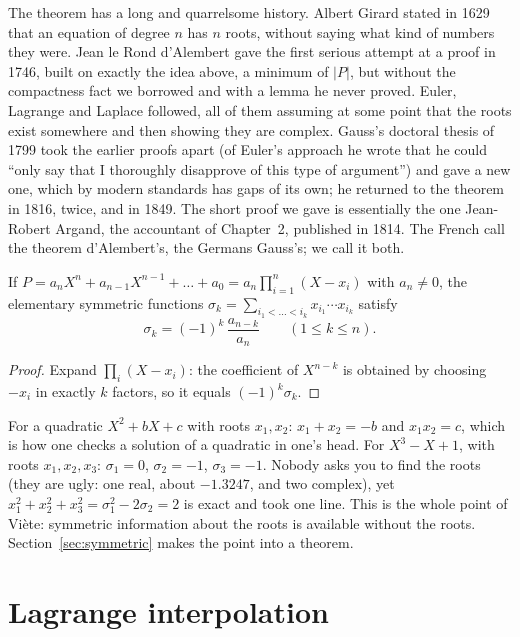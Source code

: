 The theorem has a long and quarrelsome history. Albert Girard stated in 1629 that an equation of degree $n$ has $n$ roots, without saying
what kind of numbers they were. Jean le Rond d'Alembert gave the first serious attempt at a proof in 1746, built on exactly the idea above, a
minimum of $|P|$, but without the compactness fact we borrowed and with a lemma he never proved. Euler, Lagrange and Laplace followed, all of them
assuming at some point that the roots exist somewhere and then showing they are complex. Gauss's doctoral thesis of 1799 took the earlier proofs
apart (of Euler's approach he wrote that he could ``only say that I thoroughly disapprove of this type of argument'') and gave a new one, which
by modern standards has gaps of its own; he returned to the theorem in 1816, twice, and in 1849. The short proof we gave is essentially the one
Jean-Robert Argand, the accountant of Chapter~2, published in 1814. The French call the theorem d'Alembert's, the Germans Gauss's; we call it both.

\begin{proposition}\label{prop:viete}
If $P=a_nX^n+a_{n-1}X^{n-1}+\dots+a_0=a_n\prod_{i=1}^n(X-x_i)$ with $a_n\ne0$, the elementary symmetric functions
$\sigma_k=\sum_{i_1<\dots<i_k}x_{i_1}\cdots x_{i_k}$ satisfy
\[
\sigma_k=(-1)^k\,\frac{a_{n-k}}{a_n}\qquad(1\le k\le n).
\]
\end{proposition}
\begin{proof}
Expand $\prod_i(X-x_i)$: the coefficient of $X^{n-k}$ is obtained by choosing $-x_i$ in exactly $k$ factors, so it equals $(-1)^k\sigma_k$.
\end{proof}

\begin{examplex}
For a quadratic $X^2+bX+c$ with roots $x_1,x_2$: $x_1+x_2=-b$ and $x_1x_2=c$, which is how one checks a solution of a quadratic in one's head.
For $X^3-X+1$, with roots $x_1,x_2,x_3$: $\sigma_1=0$, $\sigma_2=-1$, $\sigma_3=-1$. Nobody asks you to find the roots (they are ugly: one real,
about $-1.3247$, and two complex), yet $x_1^2+x_2^2+x_3^2=\sigma_1^2-2\sigma_2=2$ is exact and took one line. This is the whole point of Vi\`ete:
symmetric information about the roots is available without the roots. Section~\ref{sec:symmetric} makes the point into a theorem.
\end{examplex}

\section{Lagrange interpolation}

